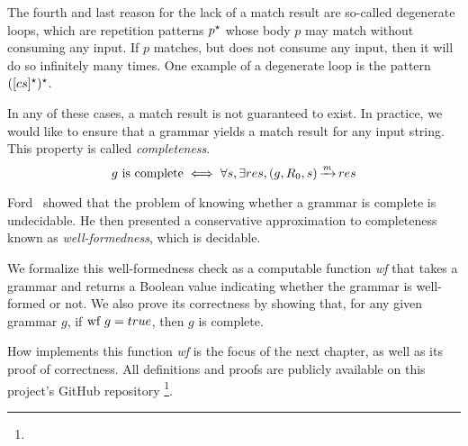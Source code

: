 The fourth and last reason
for the lack of a match result
are so-called degenerate loops,
which are repetition patterns ${p^\star}$
whose body $p$
may match without consuming any input.
If $p$ matches, but does not consume any input,
then it will do so infinitely many times.
One example of a degenerate loop is the pattern
${([cs]^\star)^\star}$.

In any of these cases,
a match result is not guaranteed to exist.
In practice,
we would like to ensure that
a grammar yields a match result
for any input string.
This property is called \emph{completeness}.
\begin{equation}
    \text{$g$ is complete} \iff
    \forall s, \exists res, \Matches{g}{\PNT{0}}{s}{res}
\end{equation}

Ford~\cite{ford_parsing_2004} showed that
the problem of knowing whether a grammar
is complete is undecidable.
He then presented a conservative approximation
to completeness known as \emph{well-formedness},
which is decidable.

We formalize this well-formedness check
as a computable function \textit{wf}
that takes a grammar and returns a Boolean value
indicating whether the grammar is well-formed or not.
We also prove its correctness by showing that,
for any given grammar $g$,
if $\text{wf}\ g = true$,
then $g$ is complete.

How \lpeg{} implements this function \textit{wf}
is the focus of the next chapter,
as well as its proof of correctness.
All definitions and proofs
are publicly available on this project's GitHub repository%
\footnote{}.
